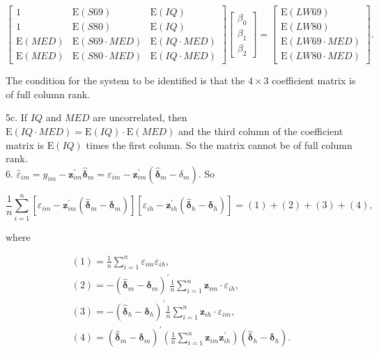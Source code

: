 \documentclass[10pt]{article}
\begin{document}
$$
\left[\begin{array}{ccc}
1 & \mathrm{E}(S 69) & \mathrm{E}(I Q) \\
1 & \mathrm{E}(S 80) & \mathrm{E}(I Q) \\
\mathrm{E}(M E D) & \mathrm{E}(S 69 \cdot M E D) & \mathrm{E}(I Q \cdot M E D) \\
\mathrm{E}(M E D) & \mathrm{E}(S 80 \cdot M E D) & \mathrm{E}(I Q \cdot M E D)
\end{array}\right]\left[\begin{array}{c}
\beta_{0} \\
\beta_{1} \\
\beta_{2}
\end{array}\right]=\left[\begin{array}{c}
\mathrm{E}(L W 69) \\
\mathrm{E}(L W 80) \\
\mathrm{E}(L W 69 \cdot M E D) \\
\mathrm{E}(L W 80 \cdot M E D)
\end{array}\right] .
$$

The condition for the system to be identified is that the $4 \times 3$ coefficient matrix is of full column rank.

5c. If $I Q$ and $M E D$ are uncorrelated, then $\mathrm{E}(I Q \cdot M E D)=\mathrm{E}(I Q) \cdot \mathrm{E}(M E D)$ and the third column of the coefficient matrix is $\mathrm{E}(I Q)$ times the first column. So the matrix cannot be of full column rank.\\
6. $\hat{\varepsilon}_{i m}=y_{i m}-\mathbf{z}_{i m}^{\prime} \hat{\boldsymbol{\delta}}_{m}=\varepsilon_{i m}-\mathbf{z}_{i m}^{\prime}\left(\hat{\boldsymbol{\delta}}_{m}-\delta_{m}\right)$. So

$$
\frac{1}{n} \sum_{i=1}^{n}\left[\varepsilon_{i m}-\mathbf{z}_{i m}^{\prime}\left(\hat{\boldsymbol{\delta}}_{m}-\boldsymbol{\delta}_{m}\right)\right]\left[\varepsilon_{i h}-\mathbf{z}_{i h}^{\prime}\left(\hat{\boldsymbol{\delta}}_{h}-\boldsymbol{\delta}_{h}\right)\right]=(1)+(2)+(3)+(4),
$$

where

$$
\begin{gathered}
(1)=\frac{1}{n} \sum_{i=1}^{n} \varepsilon_{i m} \varepsilon_{i h}, \\
(2)=-\left(\hat{\boldsymbol{\delta}}_{m}-\boldsymbol{\delta}_{m}\right)^{\prime} \frac{1}{n} \sum_{i=1}^{n} \mathbf{z}_{i m} \cdot \varepsilon_{i h}, \\
(3)=-\left(\hat{\boldsymbol{\delta}}_{h}-\boldsymbol{\delta}_{h}\right)^{\prime} \frac{1}{n} \sum_{i=1}^{n} \mathbf{z}_{i h} \cdot \varepsilon_{i m}, \\
(4)=\left(\hat{\boldsymbol{\delta}}_{m}-\boldsymbol{\delta}_{m}\right)^{\prime}\left(\frac{1}{n} \sum_{i=1}^{n} \mathbf{z}_{i m} \mathbf{z}_{i h}^{\prime}\right)\left(\hat{\boldsymbol{\delta}}_{h}-\boldsymbol{\delta}_{h}\right) .
\end{gathered}
$$
\end{document}
